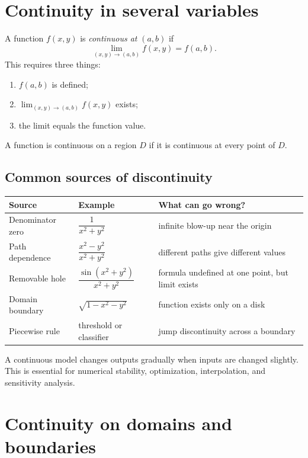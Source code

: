 \documentclass[11pt]{article}
\begin{document}
\section{Continuity in several variables}

A function $f(x,y)$ is \emph{continuous at} $(a,b)$ if
\[
\lim_{(x,y)\to(a,b)} f(x,y)=f(a,b).
\]
This requires three things:
\begin{enumerate}
  \item $f(a,b)$ is defined;
  \item $\lim_{(x,y)\to(a,b)} f(x,y)$ exists;
  \item the limit equals the function value.
\end{enumerate}
A function is continuous on a region $D$ if it is continuous at every point of $D$.

\subsection*{Common sources of discontinuity}

\begin{center}
\begin{tabular}{@{}>{\raggedright\arraybackslash}p{}>{\raggedright\arraybackslash}p{}>{\raggedright\arraybackslash}p{}@{}}
\toprule
Source & Example & What can go wrong? \\
\midrule
Denominator zero & $\dfrac{1}{x^2+y^2}$ & infinite blow-up near the origin \\
Path dependence & $\dfrac{x^2-y^2}{x^2+y^2}$ & different paths give different values \\
Removable hole & $\dfrac{\sin(x^2+y^2)}{x^2+y^2}$ & formula undefined at one point, but limit exists \\
Domain boundary & $\sqrt{1-x^2-y^2}$ & function exists only on a disk \\
Piecewise rule & threshold or classifier & jump discontinuity across a boundary \\
\bottomrule
\end{tabular}
\end{center}

\begin{tipbox}
A continuous model changes outputs gradually when inputs are changed slightly. This is essential for numerical stability, optimization, interpolation, and sensitivity analysis.
\end{tipbox}

\section{Continuity on domains and boundaries}
\end{document}
